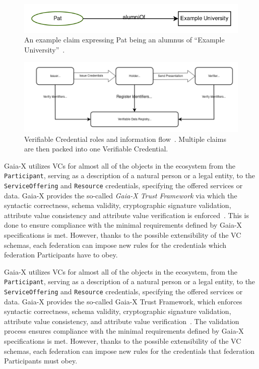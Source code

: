 \begin{figure}[h]
    \centering
    \includegraphics[width=\textwidth]{figures/verifiable-credential-claim-example.png}
    \caption{An example claim expressing Pat being an alumnus of ``Example University''~\cite{verifiable_credentials}.}\label{fig:verifiable-credential-claim}
\end{figure}
\begin{figure}
    \centering
    \includegraphics[width=\textwidth]{figures/verifiable-credentials.png}
    \caption{Verifiable Credential roles and information flow~\cite{verifiable_credentials}. Multiple claims are then packed into one Verifiable Credential.}\label{fig:verifiable-credentials}
\end{figure}

Gaia-X utilizes VCs for almost all of the objects in the ecosystem from the \texttt{Participant}, serving as a description of a natural person or a legal entity, to the \texttt{ServiceOffering} and \texttt{Resource} credentials, specifying the offered services or data.
Gaia-X provides the so-called \textit{Gaia-X Trust Framework} via which the syntactic correctness, schema validity, cryptographic signature validation, attribute value consistency and attribute value verification is enforced~\cite{gaiax_architecture_document}.
This is done to ensure compliance with the minimal requirements defined by Gaia-X specifications is met.
However, thanks to the possible extensibility of the VC schemas, each federation can impose new rules for the credentials which federation Participants have to obey.


Gaia-X utilizes VCs for almost all of the objects in the ecosystem, from the \texttt{Participant}, serving as a description of a natural person or a legal entity, to the \texttt{ServiceOffering} and \texttt{Resource} credentials, specifying the offered services or data.
Gaia-X provides the so-called Gaia-X Trust Framework, which enforces syntactic correctness, schema validity, cryptographic signature validation, attribute value consistency, and attribute value verification~\cite{gaiax_architecture_document}.
The validation process ensures compliance with the minimal requirements defined by Gaia-X specifications is met.
However, thanks to the possible extensibility of the VC schemas, each federation can impose new rules for the credentials that federation Participants must obey.

